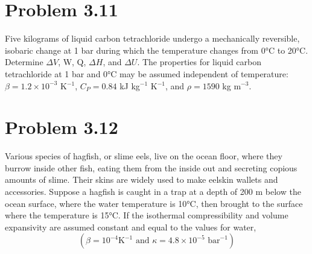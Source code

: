 \documentclass{article}
\begin{document}
\section*{Problem 3.11}
Five kilograms of liquid carbon tetrachloride undergo a mechanically reversible, isobaric change at 1 bar during which the temperature changes from 0°C to 20°C. Determine $\Delta V$, W, Q, $\Delta H$, and $\Delta U$. The properties for liquid carbon tetrachloride at 1 bar and 0°C may be assumed independent of temperature: $\beta = 1.2 \times 10^{-3}$ K$^{-1}$, $C_P = 0.84$ kJ kg$^{-1}$ K$^{-1}$, and $\rho = 1590$ kg m$^{-3}$.

\section*{Problem 3.12}
Various species of hagfish, or slime eels, live on the ocean floor, where they burrow inside other fish, eating them from the inside out and secreting copious amounts of slime. Their skins are widely used to make eelskin wallets and accessories. Suppose a hagfish is caught in a trap at a depth of 200 m below the ocean surface, where the water temperature is 10°C, then brought to the surface where the temperature is 15°C. If the isothermal compressibility and volume expansivity are assumed constant and equal to the values for water,
$$ (\beta = 10^{-4} \text{K}^{-1} \text{ and } \kappa = 4.8 \times 10^{-5} \text{ bar}^{-1}) $$
\end{document}
